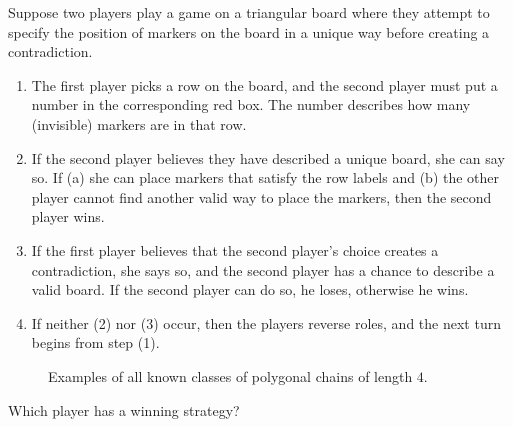 \documentclass{article}
\begin{document}
Suppose two players play a game on a triangular board where they attempt to
specify the position of markers on the board in a unique way before creating a
contradiction.
\begin{enumerate}[(1)]
  \item The first player picks a row on the board, and the second player must
    put a number in the corresponding red box. The number describes how many
    (invisible) markers are in that row.
  \item If the second player believes they have described a unique board, she
    can say so. If (a) she can place markers that satisfy the row labels and
    (b) the other player cannot find another valid way to place the markers,
    then the second player wins.
  \item If the first player believes that the second player's choice creates a
    contradiction, she says so, and the second player has a chance to describe
    a valid board. If the second player can do so, he loses, otherwise he
    wins.
  \item If neither (2) nor (3) occur, then the players reverse roles, and the
  next turn begins from step (1).
\end{enumerate}
\begin{figure}[ht!]
  \centering
  \caption{
    Examples of all known classes of polygonal chains of length $4$.
  }
\end{figure}
\begin{question}
  Which player has a winning strategy?
\end{question}
\end{document}

